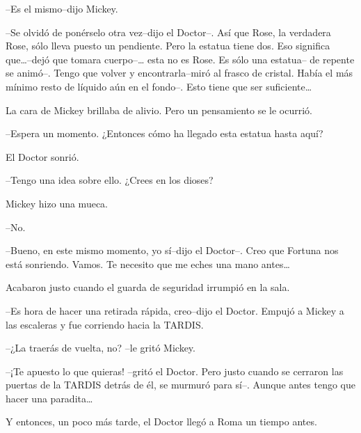 --Es el mismo--dijo Mickey.

--Se olvidó de ponérselo otra vez--dijo el Doctor--. Así que Rose, la
verdadera Rose, sólo lleva puesto un pendiente. Pero la estatua tiene
dos. Eso significa que\ldots{}--dejó que tomara cuerpo--\ldots{} esta no
es Rose. Es sólo una estatua-- de repente se animó--. Tengo que volver y
encontrarla--miró al frasco de cristal. Había el más mínimo resto de
líquido aún en el fondo--. Esto tiene que ser suficiente\ldots{}

La cara de Mickey brillaba de alivio. Pero un pensamiento se le ocurrió.

--Espera un momento. ¿Entonces cómo ha llegado esta estatua hasta aquí?

El Doctor sonrió.

--Tengo una idea sobre ello. ¿Crees en los dioses?

Mickey hizo una mueca.

--No.

--Bueno, en este mismo momento, yo sí--dijo el Doctor--. Creo que
Fortuna nos está sonriendo. Vamos. Te necesito que me eches una mano
antes\ldots{}

Acabaron justo cuando el guarda de seguridad irrumpió en la sala.

--Es hora de hacer una retirada rápida, creo--dijo el Doctor. Empujó a
Mickey a las escaleras y fue corriendo hacia la TARDIS.

--¿La traerás de vuelta, no? --le gritó Mickey.

--¡Te apuesto lo que quieras! --gritó el Doctor. Pero justo cuando se
cerraron las puertas de la TARDIS detrás de él, se murmuró para sí--.
Aunque antes tengo que hacer una paradita\ldots{}

Y entonces, un poco más tarde, el Doctor llegó a Roma un tiempo antes.
